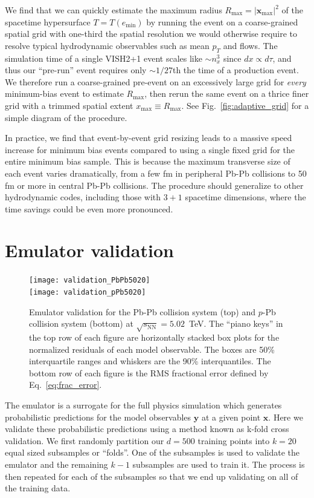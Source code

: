 \documentclass[aps,prc,reprint,amsmath,nofootinbib]{revtex4-1}
\newcommand{\sqrts}{\sqrt{s_\mathrm{NN}}}
\newcommand{\xv}{\mathbf x}
\newcommand{\yv}{\mathbf y}
\begin{document}
We find that we can quickly estimate the maximum radius $R_\text{max} = |\xv_\text{max}|^2$ of the spacetime hypersurface ${T = T(e_\text{min})}$ by running the event on a coarse-grained spatial grid with one-third the spatial resolution we would otherwise require to resolve typical hydrodynamic observables such as mean $p_T$ and flows.
The simulation time of a single VISH2+1 event scales like ${\sim}n_x^3$ since $dx \propto d\tau$, and thus our ``pre-run'' event requires only ${\sim}1/27$th the time of a production event.
We therefore run a coarse-grained pre-event on an excessively large grid for \emph{every} minimum-bias event to estimate $R_\text{max}$, then rerun the same event on a thrice finer grid with a trimmed spatial extent $x_\text{max} \equiv R_\text{max}$.
See Fig.~\ref{fig:adaptive_grid} for a simple diagram of the procedure.

In practice, we find that event-by-event grid resizing leads to a massive speed increase for minimum bias events compared to using a single fixed grid for the entire minimum bias sample.
This is because the maximum transverse size of each event varies dramatically, from a few fm in peripheral Pb-Pb collisions to 50 fm or more in central Pb-Pb collisions.
The procedure should generalize to other hydrodynamic codes, including those with $3+1$ spacetime dimensions, where the time savings could be even more pronounced.


\section{Emulator validation}
\label{app:validation}

\begin{figure}
  \texttt{[image: validation\_PbPb5020]}\\
  \texttt{[image: validation\_pPb5020]}
  \caption{
    \label{fig:validation_all}
    Emulator validation for the Pb-Pb collision system (top) and $p$-Pb collision system (bottom) at $\sqrts=5.02$~TeV.
    The ``piano keys'' in the top row of each figure are horizontally stacked box plots for the normalized residuals of each model observable.
    The boxes are 50\% interquartile ranges and whiskers are the 90\% interquantiles.
    The bottom row of each figure is the RMS fractional error defined by Eq.~\eqref{eq:frac_error}.
  }
\end{figure}

The emulator is a surrogate for the full physics simulation which generates probabilistic predictions for the model observables $\yv$ at a given point $\xv$.
Here we validate these probabilistic predictions using a method known as k-fold cross validation.
We first randomly partition our $d=500$ training points into $k=20$ equal sized subsamples or ``folds''.
One of the subsamples is used to validate the emulator and the remaining $k-1$ subsamples are used to train it.
The process is then repeated for each of the subsamples so that we end up validating on all of the training data.
\end{document}
